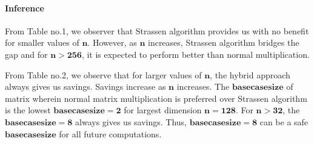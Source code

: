 \documentclass[a4paper,11pt]{article}
\begin{document}
\paragraph{Inference}

From Table no.1, we observer that Strassen algorithm provides us with no benefit for smaller values of $\mathbf{n}$. However, as $\mathbf{n}$ increases, Strassen algorithm bridges the gap and for $\mathbf{n>256}$, it is expected to perform better than normal multiplication.

From Table no.2, we observe that for larger values of $\mathbf{n}$, the hybrid approach always gives us savings. Savings increase as $\mathbf{n}$ increases.
The $\mathbf{base case size}$ of matrix wherein normal matrix multiplication is preferred over Strassen algorithm is the lowest $\mathbf{base case size = 2}$ for largest dimension $\mathbf{n = 128}$.
For $\mathbf{n>32}$, the $\mathbf{base case size = 8}$ always gives us savings. Thus, $\mathbf{base case size = 8}$ can be a safe $\mathbf{base case size}$ for all future computations.
\end{document}
